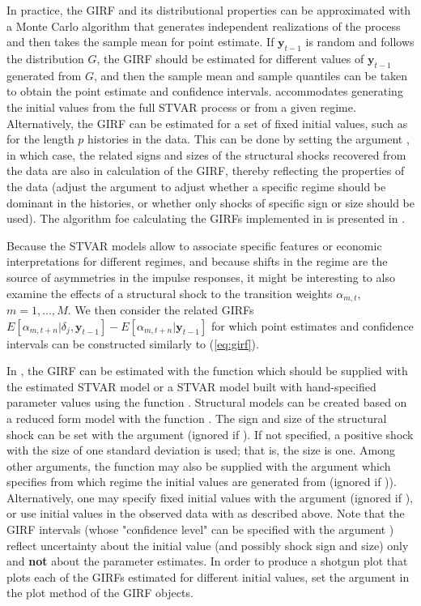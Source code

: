 \documentclass[nojss]{jss}
\begin{document}
In practice, the GIRF and its distributional properties can be approximated with a Monte Carlo algorithm that generates independent realizations of the process and then takes the sample mean for point estimate. If $\boldsymbol{y}_{t-1}$ is random and follows the distribution $G$, the GIRF should be estimated for different values of $\boldsymbol{y}_{t-1}$ generated from $G$, and then the sample mean and sample quantiles can be taken to obtain the point estimate and confidence intervals.  accommodates generating the initial values from the full STVAR process or from a given regime. Alternatively, the GIRF can be estimated for a set of fixed initial values, such as for the length $p$ histories in the data. This can be done by setting the argument , in which case, the related signs and sizes of the structural shocks recovered from the data are also in calculation of the GIRF, thereby reflecting the properties of the data (adjust the argument  to adjust whether a specific regime should be dominant in the histories, or whether only shocks of specific sign or size should be used). The algorithm foe calculating the GIRFs implemented in  is presented in \cite{Lanne+Virolainen:2024}.

Because the STVAR models allow to associate specific features or economic interpretations for different regimes, and because shifts in the regime are the source of asymmetries in the impulse responses, it might be interesting to also examine the effects of a structural shock to the transition weights $\alpha_{m,t}$, $m=1,...,M$. We then consider the related GIRFs $E[\alpha_{m,t+n}|\delta_j,\boldsymbol{y}_{t-1}] - E[\alpha_{m,t+n}|\boldsymbol{y}_{t-1}]$ for which point estimates and confidence intervals can be constructed similarly to (\ref{eq:girf}).

In , the GIRF can be estimated with the function  which should be supplied with the estimated STVAR model or a STVAR model built with hand-specified parameter values using the function . Structural models can be created based on a reduced form model with the function . The sign and size of the structural shock can be set with the argument  (ignored if ). If not specified, a positive shock with the size of one standard deviation is used; that is, the size is one. Among other arguments, the function may also be supplied with the argument  which specifies from which regime the initial values are generated from (ignored if )). Alternatively, one may specify fixed initial values with the argument  (ignored if ), or use initial values in the observed data with  as described above. Note that the GIRF intervals (whose "confidence level" can be specified with the argument ) reflect uncertainty about the initial value (and possibly shock sign and size) only and \textbf{not} about the parameter estimates. In order to produce a shotgun plot that plots each of the GIRFs estimated for different initial values, set the argument  in the plot method of the GIRF objects.
\end{document}
